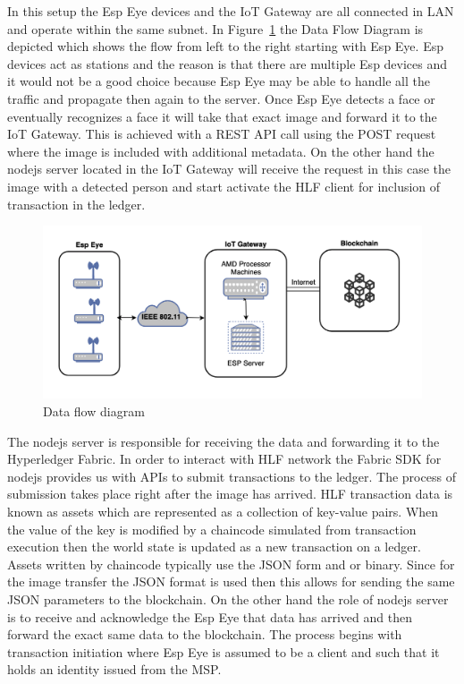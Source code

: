 In this setup the Esp Eye devices and the IoT Gateway are all connected in LAN and operate within the same subnet. In Figure~\ref{fig:dataflow} the Data Flow Diagram is depicted which shows the flow from left to the right starting with Esp Eye. Esp devices act as stations and the reason is that there are multiple Esp devices and it would not be a good choice because Esp Eye may be able to handle all the traffic and propagate then again to the server. 
Once Esp Eye detects a face or eventually recognizes a face it will take that exact image and forward it to the IoT Gateway. This is achieved with a REST API call using the POST request where the image is included with additional metadata. On the other hand the nodejs server located in the IoT Gateway will receive the request in this case the image with  a detected person and start activate the HLF client for inclusion of transaction in the ledger.


\begin{figure}[!htb]
    \centering
    \includegraphics[width=1\textwidth]{figures/dataflow.png}
    \caption{Data flow diagram}
    \label{fig:dataflow}
\end{figure}
The nodejs server is responsible for receiving the data and forwarding it to the Hyperledger Fabric. 
In order to interact with HLF network the Fabric SDK for nodejs provides us with APIs to submit transactions to the ledger. The process of submission takes place right after the image has arrived. HLF transaction data is known as assets which are represented as a collection of key-value pairs. When the value of the key is modified by a chaincode simulated from transaction execution then the world state is updated as a new transaction on a ledger. Assets written by chaincode typically use the JSON form and or binary. Since for the image transfer the JSON format is used then this allows for sending the same JSON parameters to the blockchain. On the other hand the role of nodejs server is to receive and acknowledge the Esp Eye that data has arrived and then forward the exact same data to the blockchain. The process begins with transaction initiation where Esp Eye is assumed to be a client and such that it holds an identity issued from the MSP. 

